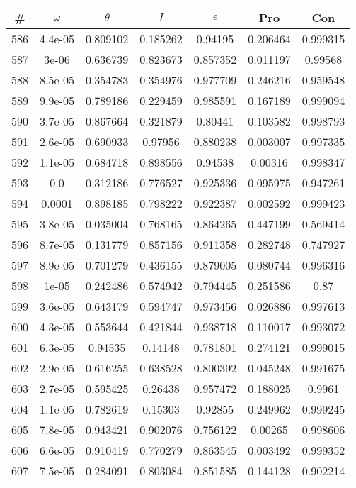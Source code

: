 \newpage
\begin{table}
\begin{tabular}{c|c|c|c|c|c|c}
\# & $\omega$ & $\theta$ & $I$ & $\epsilon$ & Pro & Con\\
\hline
586 & 4.4e-05 & 0.809102 & 0.185262 & 0.94195 & 0.206464 & 0.999315\\
587 & 3e-06 & 0.636739 & 0.823673 & 0.857352 & 0.011197 & 0.99568\\
588 & 8.5e-05 & 0.354783 & 0.354976 & 0.977709 & 0.246216 & 0.959548\\
589 & 9.9e-05 & 0.789186 & 0.229459 & 0.985591 & 0.167189 & 0.999094\\
590 & 3.7e-05 & 0.867664 & 0.321879 & 0.80441 & 0.103582 & 0.998793\\
591 & 2.6e-05 & 0.690933 & 0.97956 & 0.880238 & 0.003007 & 0.997335\\
592 & 1.1e-05 & 0.684718 & 0.898556 & 0.94538 & 0.00316 & 0.998347\\
593 & 0.0 & 0.312186 & 0.776527 & 0.925336 & 0.095975 & 0.947261\\
594 & 0.0001 & 0.898185 & 0.798222 & 0.922387 & 0.002592 & 0.999423\\
595 & 3.8e-05 & 0.035004 & 0.768165 & 0.864265 & 0.447199 & 0.569414\\
596 & 8.7e-05 & 0.131779 & 0.857156 & 0.911358 & 0.282748 & 0.747927\\
597 & 8.9e-05 & 0.701279 & 0.436155 & 0.879005 & 0.080744 & 0.996316\\
598 & 1e-05 & 0.242486 & 0.574942 & 0.794445 & 0.251586 & 0.87\\
599 & 3.6e-05 & 0.643179 & 0.594747 & 0.973456 & 0.026886 & 0.997613\\
600 & 4.3e-05 & 0.553644 & 0.421844 & 0.938718 & 0.110017 & 0.993072\\
601 & 6.3e-05 & 0.94535 & 0.14148 & 0.781801 & 0.274121 & 0.999015\\
602 & 2.9e-05 & 0.616255 & 0.638528 & 0.800392 & 0.045248 & 0.991675\\
603 & 2.7e-05 & 0.595425 & 0.26438 & 0.957472 & 0.188025 & 0.9961\\
604 & 1.1e-05 & 0.782619 & 0.15303 & 0.92855 & 0.249962 & 0.999245\\
605 & 7.8e-05 & 0.943421 & 0.902076 & 0.756122 & 0.00265 & 0.998606\\
606 & 6.6e-05 & 0.910419 & 0.770279 & 0.863545 & 0.003492 & 0.999352\\
607 & 7.5e-05 & 0.284091 & 0.803084 & 0.851585 & 0.144128 & 0.902214\\

\end{tabular}
\end{table}
